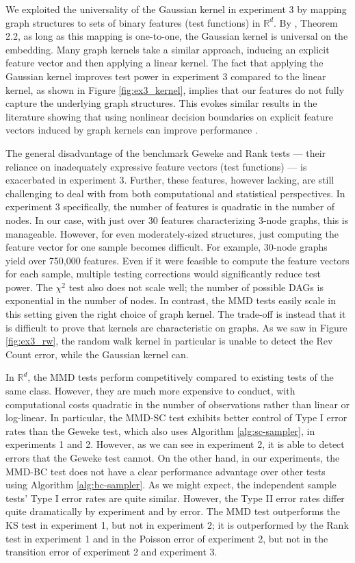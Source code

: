 \documentclass[a4paper,11pt]{article}
\begin{document}
We exploited the universality of the Gaussian kernel in experiment 3 by mapping graph structures to sets of binary features (test functions) in $\mathbb{R}^{d}$. By \cite{christmann_universal_2010}, Theorem 2.2, as long as this mapping is one-to-one, the Gaussian kernel is universal on the embedding. Many graph kernels take a similar approach, inducing an explicit feature vector and then applying a linear kernel. The fact that applying the Gaussian kernel improves test power in experiment 3 compared to the linear kernel, as shown in Figure \ref{fig:ex3_kernel}, implies that our features do not fully capture the underlying graph structures. This evokes similar results in the literature showing that using nonlinear decision boundaries on explicit feature vectors induced by graph kernels can improve performance \cite{kriege_survey_2020}. 

The general disadvantage of the benchmark Geweke and Rank tests --- their reliance on inadequately expressive feature vectors (test functions) --- is exacerbated in experiment 3. Further, these features, however lacking, are still challenging to deal with from both computational and statistical perspectives. In experiment 3 specifically, the number of features is quadratic in the number of nodes. In our case, with just over 30 features characterizing 3-node graphs, this is manageable. However, for even moderately-sized structures, just computing the feature vector for one sample becomes difficult. For example, 30-node graphs yield over 750,000 features. Even if it were feasible to compute the feature vectors for each sample, multiple testing corrections would significantly reduce test power. The $\chi^{2}$ test also does not scale well; the number of possible DAGs is exponential in the number of nodes. In contrast, the MMD tests easily scale in this setting given the right choice of graph kernel. The trade-off is instead that it is difficult to prove that kernels are characteristic on graphs. As we saw in Figure \ref{fig:ex3_rw}, the random walk kernel in particular is unable to detect the Rev Count error, while the Gaussian kernel can.

In $\mathbb{R}^{d}$, the MMD tests perform competitively compared to existing tests of the same class. However, they are much more expensive to conduct, with computational costs quadratic in the number of observations rather than linear or log-linear. In particular, the MMD-SC test exhibits better control of Type I error rates than the Geweke test, which also uses Algorithm \ref{alg:sc-sampler}, in experiments 1 and 2. However, as we can see in experiment 2, it is able to detect errors that the Geweke test cannot. On the other hand, in our experiments, the MMD-BC test does not have a clear performance advantage over other tests using Algorithm \ref{alg:bc-sampler}. As we might expect, the independent sample tests' Type I error rates are quite similar. However, the Type II error rates differ quite dramatically by experiment and by error. The MMD test outperforms the KS test in experiment 1, but not in experiment 2; it is outperformed by the Rank test in experiment 1 and in the Poisson error of experiment 2, but not in the transition error of experiment 2 and experiment 3. 
\end{document}
